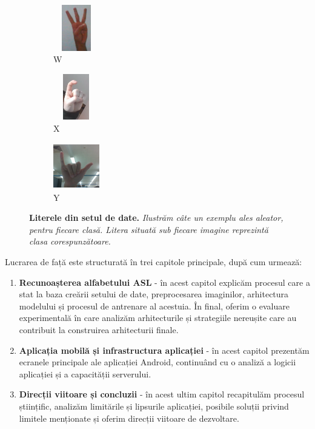 \begin{figure}[H]
  

  \begin{subfigure}{0.1\textwidth}
    \includegraphics[width=2cm, height=2cm, keepaspectratio=false]{images/7-anexe/w_ex1.jpg}
    \caption{W}
  \end{subfigure}\hspace{1cm}
  \begin{subfigure}{0.1\textwidth}
    \includegraphics[width=2cm, height=2cm, keepaspectratio=false]{images/7-anexe/x_ex1.png}
    \caption{X}
  \end{subfigure}\hspace{1cm}
  \begin{subfigure}{0.1\textwidth}
    \includegraphics[width=2cm, height=2cm, keepaspectratio=false]{images/7-anexe/y_ex1.jpg}
    \caption{Y}
  \end{subfigure}\hspace{1cm}
  \caption[Literele din setul de date.]{\textbf{Literele din setul de date.} \textit{Ilustrăm câte un exemplu ales aleator, pentru fiecare clasă. Litera situată sub fiecare imagine reprezintă clasa corespunzătoare.}}
  \label{fig:ex_per_litera}
\end{figure}
\captionsetup[subfigure]{labelformat=parens, labelsep=space}

Lucrarea de față este structurată în trei capitole principale, după cum urmează:
\begin{enumerate}
    \item \textbf{Recunoașterea alfabetului ASL} - în acest capitol explicăm procesul care a stat la baza creării setului de date, preprocesarea imaginilor, arhitectura modelului și procesul de antrenare al acestuia. În final, oferim o evaluare experimentală în care analizăm arhitecturile și strategiile nereușite care au contribuit la construirea arhitecturii finale.
    \item \textbf{Aplicația mobilă și infrastructura aplicației} - în acest capitol prezentăm ecranele principale ale aplicației Android, continuând cu o analiză a logicii aplicației și a capacității serverului.
    \item \textbf{Direcții viitoare și concluzii} - în acest ultim capitol recapitulăm procesul științific, analizăm limitările și lipsurile aplicației, posibile soluții privind limitele menționate și oferim direcții viitoare de dezvoltare.
\end{enumerate}